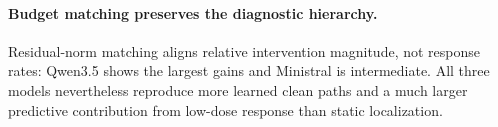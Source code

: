 \paragraph{Budget matching preserves the diagnostic hierarchy.}
Residual-norm matching aligns relative intervention magnitude, not response
rates: Qwen3.5 shows the largest gains and Ministral is intermediate. All three
models nevertheless reproduce more learned clean paths and a much larger
predictive contribution from low-dose response than static localization.

